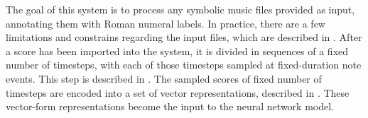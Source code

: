 

The goal of this system is to process any symbolic music
files provided as input, annotating them with Roman numeral
labels. In practice, there are a few limitations and
constrains regarding the input files, which are described in
. After a score has
been imported into the system, it is divided in sequences of
a fixed number of timesteps, with each of those timesteps
sampled at fixed-duration note events. This step is
described in . The sampled
scores of fixed number of timesteps are encoded into a set
of vector representations, described in
. These vector-form
representations become the input to the neural network
model.
